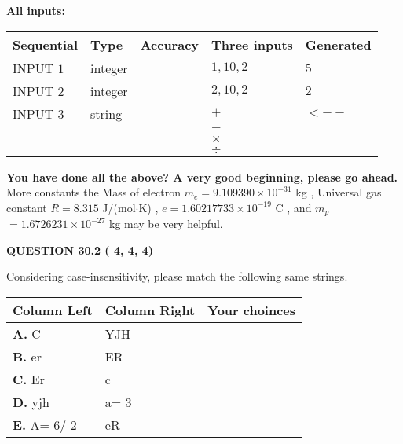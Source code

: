 \documentclass[12pt]{article}
\begin{document}
   
   
   
\noindent\vspace{0.1in}\hspace{-0.08in} {\textbf{\Large{All inputs: }}}
   
   
  
  
\noindent\begin{tabular}{|l|l|l|l|l|}
\hline
 Sequential & Type & Accuracy & Three inputs & Generated \\ 
\hline
 
 
  INPUT $           1$ & integer &  & $
 1
 , 
 10
 , 
 2
 $ & $ 5 $ 
 \\  \hline  
 
 
  INPUT $           2$ & integer &  & $
 2
 , 
 10
 , 
 2
 $ & $ 2 $ 
 \\  \hline  
 
 
  INPUT $           3$ & string & & 
 $+$ & 
  $ <-- $ 
  \\
  & & & 
 $-$ & 
  \\
  & & & 
 $\times$ & 
  \\
  & & & 
 $\div$ & 
 \\  \hline  
 \end{tabular}
   
   
   
   
\vspace{0.3in}
{\textbf{\LARGE{You have done all the above? A very good beginning, please go ahead.}}}
More constants the
Mass of electron
$m_e$$ =
9.109390 \times 10^{-31} $
kg
,
Universal gas constant
$R$$ =
8.315 $
J/(mol$\cdot $K)
,
$e$$ =
1.60217733 \times 10^{-19} $
C
, and
$m_p$$ =
1.6726231 \times 10^{-27} $
kg
%
may be very helpful.
\vspace{0.3in}
   
   
  
\vspace{0.2in}
  
{\textbf{\Large{QUESTION
30.2 
 (          4,          4,          4)
}}}
  
  
Considering case-insensitivity, please match the following same strings.
  
  
\begin{tabular}{|l|l|l|}
 \hline
 Column Left & Column Right  & Your choinces \\ 
 \hline
{\textbf{\large{
A.}}}
C
  & 
YJH
 & 
 \\ 
 \hline
{\textbf{\large{
B.}}}
er
  & 
ER
 & 
 \\ 
 \hline
{\textbf{\large{
C.}}}
Er
  & 
c
 & 
 \\ 
 \hline
{\textbf{\large{
D.}}}
yjh
  & 
 a= %
3
 & 
 \\ 
 \hline
{\textbf{\large{
E.}}}
 A= %
6/ %
2

  & 
eR
 & 
 \\ 
 \hline
 \end{tabular}
  
\end{document}
